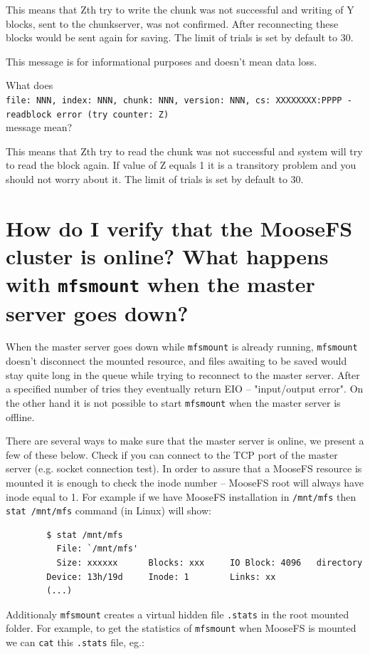 \documentclass[a4paper,11pt,english]{report}
\def\code#1{\texttt{#1}}
\begin{document}
		This means that Zth try to write the chunk was not successful and writing of Y blocks, sent to the chunkserver, was not confirmed. After reconnecting these blocks would be sent again for saving. The limit of trials is set by default to 30.
		
		This message is for informational purposes and doesn't mean data loss.
		 
		What does \\
		\code{file: NNN, index: NNN, chunk: NNN, version: NNN, cs: XXXXXXXX:PPPP - readblock error (try counter: Z)} \\
		message mean?
		 
		This means that Zth try to read the chunk was not successful and system will try to read the block again. If value of Z equals 1 it is a transitory problem and you should not worry about it. The limit of trials is set by default to 30.
		
		
		\section{How do I verify that the MooseFS cluster is online? What happens with \code{mfsmount} when the master server goes down?}
		When the master server goes down while \code{mfsmount} is already running, \code{mfsmount} doesn't disconnect the mounted resource, and files awaiting to be saved would stay quite long in the queue while trying to reconnect to the master server. After a specified number of tries they eventually return EIO -- "input/output error". On the other hand it is not possible to start \code{mfsmount} when the master server is offline.
		
		There are several ways to make sure that the master server is online, we present a few of these below.
		Check if you can connect to the TCP port of the master server (e.g. socket connection test).
		In order to assure that a MooseFS resource is mounted it is enough to check the inode number -- MooseFS root will always have inode equal to 1. For example if we have MooseFS installation in \code{/mnt/mfs} then \code{stat /mnt/mfs} command (in Linux) will show:
		
		
		\begin{lstlisting}
		$ stat /mnt/mfs
		  File: `/mnt/mfs'
		  Size: xxxxxx    	Blocks: xxx		IO Block: 4096   directory
		Device: 13h/19d		Inode: 1		Links: xx
		(...)
		\end{lstlisting}
		
		Additionaly \code{mfsmount} creates a virtual hidden file \code{.stats} in the root mounted folder. For example, to get the statistics of \code{mfsmount} when MooseFS is mounted we can \code{cat} this \code{.stats} file, eg.:
		
\end{document}
